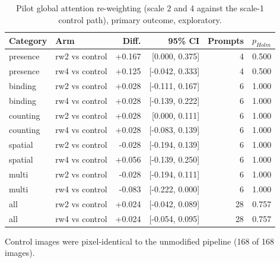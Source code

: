 \begin{table}[t]
\centering\small
\caption{Pilot global attention re-weighting (scale 2 and 4 against the scale-1 control path), primary outcome, exploratory.}
\label{tab:pilot-intervention}
\begin{tabular}{llrrrr}
\toprule
Category & Arm & Diff. & 95\% CI & Prompts & $p_{Holm}$ \\
\midrule
presence & rw2 vs control & +0.167 & [0.000, 0.375] & 4 & 0.500 \\
presence & rw4 vs control & +0.125 & [-0.042, 0.333] & 4 & 0.500 \\
binding & rw2 vs control & +0.028 & [-0.111, 0.167] & 6 & 1.000 \\
binding & rw4 vs control & +0.028 & [-0.139, 0.222] & 6 & 1.000 \\
counting & rw2 vs control & +0.028 & [0.000, 0.111] & 6 & 1.000 \\
counting & rw4 vs control & +0.028 & [-0.083, 0.139] & 6 & 1.000 \\
spatial & rw2 vs control & -0.028 & [-0.194, 0.139] & 6 & 1.000 \\
spatial & rw4 vs control & +0.056 & [-0.139, 0.250] & 6 & 1.000 \\
multi & rw2 vs control & -0.028 & [-0.194, 0.111] & 6 & 1.000 \\
multi & rw4 vs control & -0.083 & [-0.222, 0.000] & 6 & 1.000 \\
all & rw2 vs control & +0.024 & [-0.042, 0.089] & 28 & 0.757 \\
all & rw4 vs control & +0.024 & [-0.054, 0.095] & 28 & 0.757 \\
\bottomrule
\end{tabular}
\par\smallskip\footnotesize Control images were pixel-identical to the unmodified pipeline (168 of 168 images).
\end{table}
